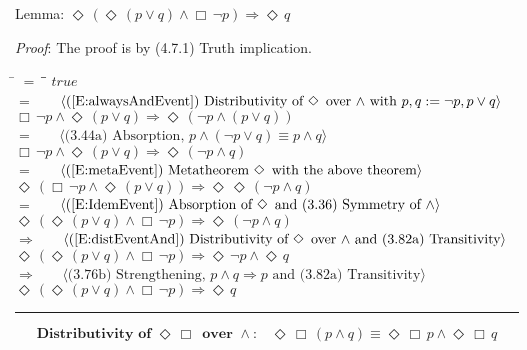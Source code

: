 \documentclass[12pt, fleqn, leqno]{article}
\newcommand{\lgap}{2pt}                             %
\newcommand{\mymathindent}{24pt}                    %
\newcommand{\impl}{\ensuremath{\Rightarrow}}        %
\newcommand{\Event}{\Diamond\,}
\newcommand{\Always}{\Box\,}
\newcommand{\myqed}{\rule[-.23ex]{1.2ex}{2.0ex}}
\newcommand{\myqedtab}{\hspace{384pt}}              %
\newcommand{\Gll} {\langle}                         %
\newcommand{\Ggg} {\rangle}                         %
\newcommand{\Hint}[1]     {\ \ \ $\Gll              \mbox{#1} \Ggg$ }   %
\begin{document}
Lemma: $\Event (\Event(p\lor q) \land \Always\neg p)\impl\Event q$

\emph{Proof}: The proof is by (4.7.1) Truth implication.
\begin{tabbing}
\hspace{\mymathindent} \= $= \;$ \= \myqedtab \= \kill
  \> \>   $true$\\[\lgap]
  \> $=$  \>  \Hint{(\ref{E:alwaysAndEvent}) Distributivity of $\Event$ over $\land$ with $p,q:=\neg p, p\lor q$}\\[\lgap]
  \> \>   $\Always \neg p \land \Event (p\lor q) \impl \Event (\neg p \land (p\lor q))$\\[\lgap]
  \> $=$ \> \Hint{(3.44a) Absorption, $p\land (\neg p\lor q)\equiv p\land q$}\\[\lgap]
  \> \>   $\Always \neg p \land \Event (p\lor q) \impl \Event (\neg p \land q)$\\[\lgap]
  \> $=$ \> \Hint{(\ref{E:metaEvent}) Metatheorem $\Event$ with the above theorem}\\[\lgap]
  \> \>   $\Event(\Always \neg p \land \Event (p\lor q)) \impl \Event\Event (\neg p \land q)$\\[\lgap]
  \> $=$  \>  \Hint{(\ref{E:IdemEvent}) Absorption of $\Event$ and (3.36) Symmetry of $\land$}\\[\lgap]
  \> \>   $\Event(\Event (p\lor q) \land \Always \neg p) \impl \Event (\neg p \land q)$\\[\lgap]
  \> $\impl$  \>  \Hint{(\ref{E:distEventAnd}) Distributivity of $\Event$ over $\land$ and (3.82a) Transitivity}\\[\lgap]
  \> \>   $\Event(\Event (p\lor q) \land \Always \neg p) \impl \Event \neg p \land \Event q$\\[\lgap]
  \> $\impl$  \> \Hint{(3.76b) Strengthening, $p\land q \impl p$ and (3.82a) Transitivity}\\[\lgap]
  \> \>   $\Event(\Event (p\lor q) \land \Always \neg p) \impl \Event q$ \quad \myqed
\end{tabbing}
\begin{equation}\label{E:distEventAlwaysAnd}
\textbf{Distributivity of $\Event\Always$ over $\land$:}\quad \Event\Always(p \land q) \equiv \Event\Always p \land \Event\Always q
\end{equation}
\end{document}
